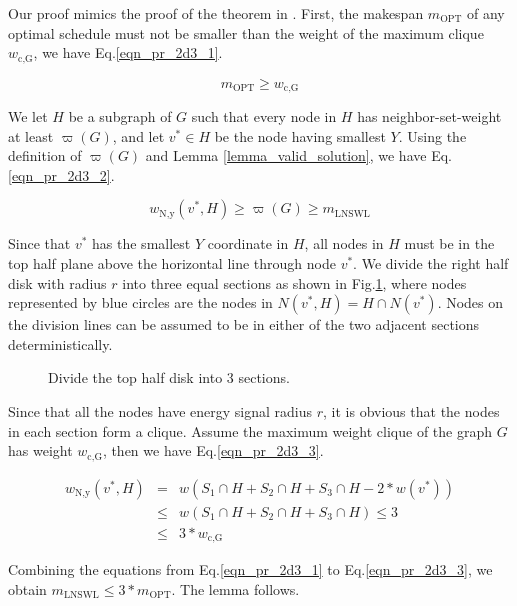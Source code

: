 \documentclass[journal,10pt]{IEEEtran}
\begin{document}
\begin{IEEEproof}
Our proof mimics the proof of the theorem in \cite{Marathe1995}. First, the makespan $m_\text{OPT}$ of any optimal schedule must not be smaller than the weight of the maximum clique $w_\text{c,G}$, we have Eq.\eqref{eqn_pr_2d3_1}.

\begin{equation}
\label{eqn_pr_2d3_1}
m_\text{OPT}{\geq}w_\text{c,G}
\end{equation}

We let $H$ be a subgraph of $G$ such that every node in $H$ has neighbor-set-weight at least $\varpi(G)$, and let $v^{*}{\in}H$ be the node having smallest $Y$. Using the definition of $\varpi(G)$ and Lemma \ref{lemma_valid_solution}, we have Eq.\eqref{eqn_pr_2d3_2}.

\begin{equation}
\label{eqn_pr_2d3_2}
w_\text{N,y}(v^{*},H){\geq}\varpi(G){\geq}m_\text{LNSWL}
\end{equation}

Since that $v^{*}$ has the smallest $Y$ coordinate in $H$, all nodes in $H$ must be in the top half plane above the horizontal line through node $v^{*}$. We divide the right half disk with radius $r$ into three equal sections as shown in Fig.\ref{fig_2d3part}, where nodes represented by blue circles are the nodes in $N(v^{*},H){=}H{\cap}N(v^{*})$. Nodes on the division lines can be assumed to be in either of the two adjacent sections deterministically.

\begin{figure}[htb]
\caption{Divide the top half disk into 3 sections.}
\label{fig_2d3part}
\end{figure}

Since that all the nodes have energy signal radius $r$, it is obvious that the nodes in each section form a clique. Assume the maximum weight clique of the graph $G$ has weight $w_\text{c,G}$, then we have Eq.\eqref{eqn_pr_2d3_3}.

\begin{equation}
\label{eqn_pr_2d3_3}
\begin{array}{rcl}
w_\text{N,y}(v^{*},H)&{=}&w(S_1{\cap}H{+}S_2{\cap}H{+}S_3{\cap}H{-}2{*}w(v^{*}))\\
&{\leq}&w(S_1{\cap}H{+}S_2{\cap}H{+}S_3{\cap}H){\leq}3\\
&{\leq}&3{*}w_\text{c,G}
\end{array}
\end{equation}

Combining the equations from Eq.\eqref{eqn_pr_2d3_1} to Eq.\eqref{eqn_pr_2d3_3}, we obtain $m_\text{LNSWL}{\leq}3{*}m_\text{OPT}$. The lemma follows.
\end{IEEEproof}
\end{document}
